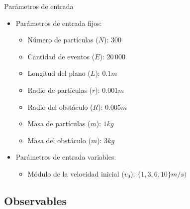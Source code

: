 \documentclass{beamer}
\begin{document}
            \begin{frame}{Parámetros de entrada}
                \begin{itemize}
                    \item Parámetros de entrada fijos:
                    \begin{itemize}
                        \item Número de partículas ($N$): \alert{$300$}
                        \item Cantidad de eventos ($E$): \alert{$20\,000$}
                        \item Longitud del plano ($L$): \alert{$0.1 m$}
                        \item Radio de partículas ($r$): \alert{$0.001 m$}
                        \item Radio del obstáculo ($R$): \alert{$0.005 m$}
                        \item Masa de partículas ($m$): \alert{$1 kg$}
                        \item Masa del obstáculo ($m$): \alert{$3 kg$}
                    \end{itemize}
                    \item Parámetros de entrada variables:
                    \begin{itemize}
                        \item Módulo de la velocidad inicial ($v_0$): \alert{$\{1, 3, 6, 10\} m/s)$}
                    \end{itemize}
                \end{itemize}
            \end{frame}

        \subsection{Observables}
\end{document}
